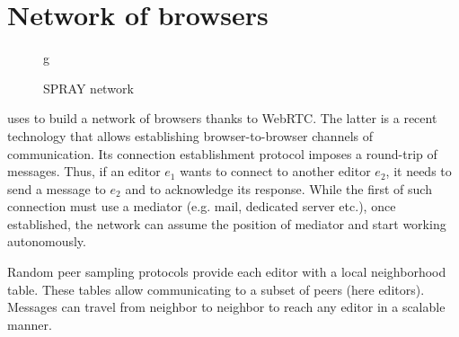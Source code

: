 
\section{Network of browsers}
\label{sec:network}

\begin{figure}
  \centering
g  
  \caption{SPRAY network }
  \label{fig:spray}
\end{figure}


\CRATE uses \SPRAY to build a network of browsers thanks to WebRTC. The latter
is a recent technology that allows establishing browser-to-browser channels of
communication. Its connection establishment protocol imposes a round-trip of
messages. Thus, if an editor $e_1$ wants to connect to another editor $e_2$, it
needs to send a message to $e_2$ and to acknowledge its response. While the
first of such connection must use a mediator (e.g. mail, dedicated server etc.),
once established, the network can assume the position of mediator and start
working autonomously.

Random peer sampling protocols provide each editor with a local neighborhood
table. These tables allow communicating to a subset of peers (here
editors). Messages can travel from neighbor to neighbor to reach any editor in a
scalable manner.



